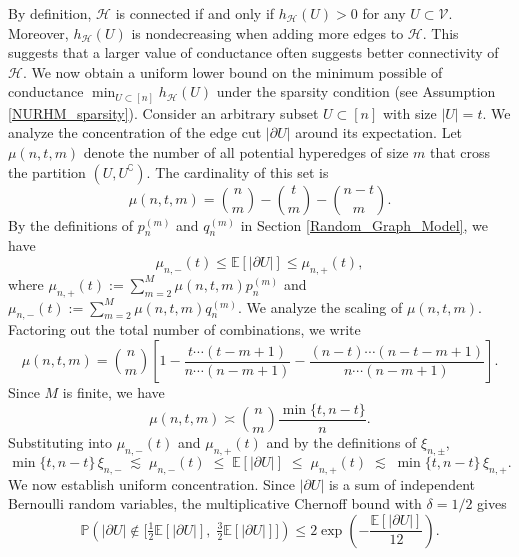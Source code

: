 \documentclass[
  12pt]{article}
\begin{document}
\noindent By definition, $\mathcal{H}$ is connected if and only if $h_{\mathcal{H}}(U)>0$ for any $U\subset \mathcal{V}$. Moreover, $h_{\mathcal{H}}(U)$ is nondecreasing when adding more edges to $\mathcal{H}$. This suggests that a larger value of conductance often suggests better connectivity of $\mathcal{H}$.  
We now obtain a uniform lower bound on the minimum possible of conductance $\min_{U \subset[n]} h_{\mathcal{H}}(U)$ under the sparsity condition (see Assumption \ref{NURHM_sparsity}).   Consider an arbitrary subset $U \subset [n]$ with size $|U|=t$. We analyze the concentration of the edge cut $|\partial U|$ around its expectation. Let $\mu(n,t,m)$ denote the number of all potential hyperedges of size $m$ that cross the partition $(U, U^\complement)$. The cardinality of this set is
$$
\mu(n,t,m) = \binom{n}{m} - \binom{t}{m} - \binom{n-t}{m}.
$$
\noindent By the definitions of $p_n^{(m)}$ and $q_n^{(m)}$ in Section \ref{Random_Graph_Model}, we have
\begin{equation*}
\mu_{n,-}(t) \leq \mathbb{E}[|\partial U|] \leq \mu_{n,+}(t),
\end{equation*}
where $\mu_{n, +}(t) := \sum_{m=2}^M \mu(n, t, m) p_n^{(m)}$ and $\mu_{n, -}(t) := \sum_{m=2}^M \mu(n, t, m) q_n^{(m)}$. We analyze the scaling of $\mu(n, t, m)$. Factoring out the total number of combinations, we write
$$
\mu(n, t, m)=\binom{n}{m} \left[1-\frac{t \cdots(t-m+1)}{n \cdots(n-m+1)}-\frac{(n-t) \cdots(n-t-m+1)}{n \cdots(n-m+1)}\right].
$$
Since $M$ is finite, we have
\begin{equation*}
\mu(n, t, m) \asymp \binom{n}{m} \frac{ \min \{t, n-t\}}{n}.
\end{equation*}
Substituting into $\mu_{n, -}(t)$ and $\mu_{n, +}(t)$ and by the definitions of $\xi_{n, \pm}$, 
\begin{equation}\label{eq:expected_cut_order}
\min\{t,n-t\}\,\xi_{n,-} \;\lesssim\; \mu_{n,-}(t) \;\leq\; \mathbb{E}[|\partial U|] \;\leq\; \mu_{n,+}(t) \;\lesssim\; \min\{t,n-t\}\,\xi_{n,+}.
\end{equation}
\noindent We now establish uniform concentration. Since $|\partial U|$ is a sum of independent Bernoulli random variables, the multiplicative Chernoff bound with $\delta = 1/2$ gives
\begin{equation}\label{eq:chernoff_single}
\mathbb{P}\!\left(|\partial U| \notin \bigl[\tfrac{1}{2}\mathbb{E}[|\partial U|],\;\tfrac{3}{2}\mathbb{E}[|\partial U|]\bigr]\right) \leq 2\exp\!\left(-\frac{\mathbb{E}[|\partial U|]}{12}\right).
\end{equation}
\end{document}
